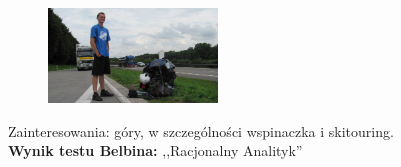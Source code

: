 \begin{figure}[H]
	\centering
	\includegraphics[width=0.4\textwidth]{img/grzesiek.jpg}
\end{figure}
Zainteresowania: góry, w szczególności wspinaczka i skitouring.\\
\textbf{Wynik testu Belbina: },,Racjonalny Analityk''


